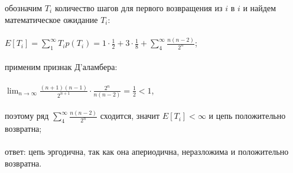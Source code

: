 \documentclass[a4paper]{article}
\begin{document}
\begin{large}
	обозначим $T_i$ количество шагов для первого возвращения из $i$ в $i$ и найдем математическое ожидание $T_i$:\\\\
	$E[T_i]=\sum_{1}^{\infty}T_ip(T_i)=1\cdot\frac{1}{2}+3\cdot\frac{1}{8}+\sum_{4}^{\infty}\frac{n(n-2)}{2^n}$;\\\\
	применим признак Д'аламбера:\\\\ $\lim_{n\rightarrow\infty}\frac{(n+1)(n-1)}{2^{n+1}}\cdot\frac{2^n}{n(n-2)}=\frac{1}{2}<1$,\\\\
	поэтому ряд $\sum_{4}^{\infty}\frac{n(n-2)}{2^n}$ сходится, значит $E[T_i]<\infty$ и цепь положительно возвратна;\\\\
	ответ: цепь эргодична, так как она апериодична, неразложима и положительно возвратна.
	\end{large}
\end{document}
